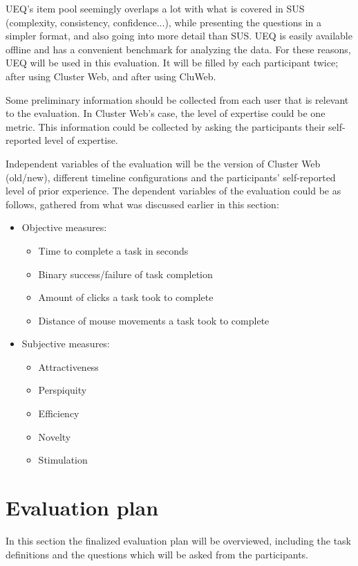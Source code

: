 UEQ's item pool seemingly overlaps a lot with what is covered in SUS (complexity, consistency, confidence...), while presenting the questions in a simpler format, and also going into more detail than SUS. UEQ is easily available offline and has a convenient benchmark for analyzing the data. For these reasons, UEQ will be used in this evaluation. It will be filled by each participant twice; after using Cluster Web, and after using CluWeb.

Some preliminary information should be collected from each user that is relevant to the evaluation. In Cluster Web's case, the level of expertise could be one metric. This information could be collected by asking the participants their self-reported level of expertise.

Independent variables of the evaluation will be the version of Cluster Web (old/new), different timeline configurations and the participants' self-reported level of prior experience. The dependent variables of the evaluation could be as follows, gathered from what was discussed earlier in this section:

\begin{itemize}
\item Objective measures:
\begin{itemize}
\item Time to complete a task in seconds
\item Binary success/failure of task completion
\item Amount of clicks a task took to complete
\item Distance of mouse movements a task took to complete
\end{itemize}
\item Subjective measures:
\begin{itemize}
\item Attractiveness
\item Perspiquity
\item Efficiency
\item Novelty
\item Stimulation
\end{itemize}
\end{itemize}

\section{Evaluation plan}
In this section the finalized evaluation plan will be overviewed, including the task definitions and the questions which will be asked from the participants.

